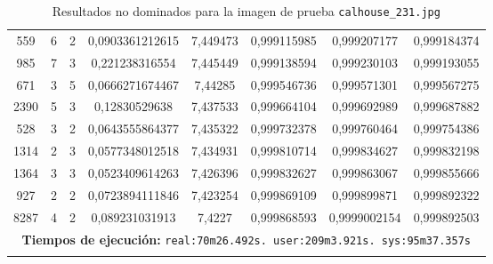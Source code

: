 \begin{longtable}{|c|c|c|c|c|c|c|c|}
559 & 6 & 2 & 0,0903361212615 & 7,449473 & 0,999115985 & 0,999207177 & 0,999184374 \\
985 & 7 & 3 & 0,221238316554 & 7,445449 & 0,999138594 & 0,999230103 & 0,999193055 \\
671 & 3 & 5 & 0,0666271674467 & 7,44285 & 0,999546736 & 0,999571301 & 0,999567275 \\
2390 & 5 & 3 & 0,12830529638 & 7,437533 & 0,999664104 & 0,999692989 & 0,999687882 \\
528 & 3 & 2 & 0,0643555864377 & 7,435322 & 0,999732378 & 0,999760464 & 0,999754386 \\
1314 & 2 & 3 & 0,0577348012518 & 7,434931 & 0,999810714 & 0,999834627 & 0,999832198 \\
1364 & 3 & 3 & 0,0523409614263 & 7,426396 & 0,999832627 & 0,999863067 & 0,999855666 \\
927 & 2 & 2 & 0,0723894111846 & 7,423254 & 0,999869109 & 0,999899871 & 0,999892322 \\
8287 & 4 & 2 & 0,089231031913 & 7,4227 & 0,999868593 & 0,9999002154 & 0,999892503 \\
\hline
\multicolumn{8}{|c|}{\textbf{Tiempos de ejecución:} \texttt{real:70m26.492s. user:209m3.921s. sys:95m37.357s}}\\ \hline
\caption{Resultados no dominados para la imagen de prueba \texttt{calhouse\_231.jpg}}
\label{tab:calhouse_231}
\end{longtable}
\normalsize

